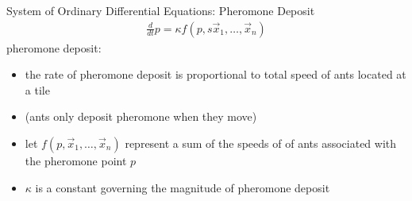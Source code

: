 \begin{frame}{System of Ordinary Differential Equations: Pheromone Deposit}
\begin{align*}
\frac{d}{dt} p = \kappa f(p,s\vec{x}_1,\hdots,\vec{x}_n)
\end{align*}
\alert{pheromone deposit:}
\begin{itemize}
	\item the rate of pheromone deposit is proportional to total speed of ants located at a tile
    \item (ants only deposit pheromone when they move)
    \item let $f(p, \vec{x}_1,\hdots,\vec{x}_n)$ represent a sum of the speeds of of ants associated with the pheromone point $p$
    \item $\kappa$ is a constant governing the magnitude of pheromone deposit
\end{itemize}
\end{frame}

